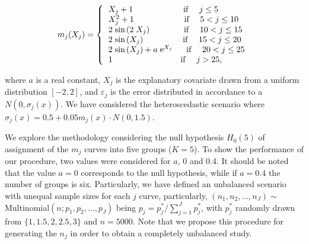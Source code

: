 \begin{equation}
m_j(X_j)=\left \{ {
\begin {tabular} {lcc}
$X_j + 1 $ \hspace{1.90cm} {\text if} \quad $j \le 5 $\\
$X_j^2 + 1$ \hspace{1.90cm} {\text if} \quad $5 < j \le 10 $\\
$2 \hspace{0.10cm} {\rm sin} \hspace{0.05cm}(2 \hspace{0.10cm}X_j)$ \hspace{1.22cm} {\text if} \quad $10 < j \le 15 $\\
$2 \hspace{0.10cm} {\rm sin}\hspace{0.05cm}(X_j)$ \hspace{1.45cm} {\text if} \quad $15 < j \le 20 $\\
$2 \hspace{0.10cm} {\rm sin} \hspace{0.05cm}(X_j) + a \hspace{0.10cm} \mathrm{e}^{X_j}$ \hspace{0.35cm} {\text if} \quad $20 < j \le 25 $\\
$1$  \hspace{2.65cm} {\text if} \quad $j > 25 $,\\
\end {tabular}
}\right.
\label{noramv:eq2}
\end{equation}

\noindent where $a$ is a real constant, $X_j$ is the explanatory covariate drawn from a   uniform distribution $[-2,2]$, and  $\varepsilon_j$ is the error distributed in accordance to a $N(0, \sigma_j(x))$. We have considered the heteroscedastic scenario where  $\sigma_j(x)=0.5+0.05m_j(x) \cdot N(0, 1.5)$.

We explore the methodology considering the null hypothesis $H_0(5)$ of assignment of the $m_j$ curves  into five groups ($K= 5$). To show the performance of our procedure, two values were considered for $a$,  0 and 0.4. It should be noted that the value  $a=0$ corresponds to the null hypothesis, while if $a=0.4$ the number of groups is six. Particularly, we have defined an unbalanced scenario with unequal sample sizes for each $j$ curve, particularly, $(n_1, n_2, \ldots, n_J) \sim$ Multinomial$(n;  p_1, p_2, \ldots, p_J)$  being $p_j = p_j^\ast /\sum_{j=1}^{J} p_j^\ast$, with  $p_j^\ast$ randomly drawn from  $\{1, 1.5, 2, 2.5, 3\}$ and $n = 5000$. Note that we propose this procedure for generating the  $n_j$ in order to obtain a completely unbalanced study.



